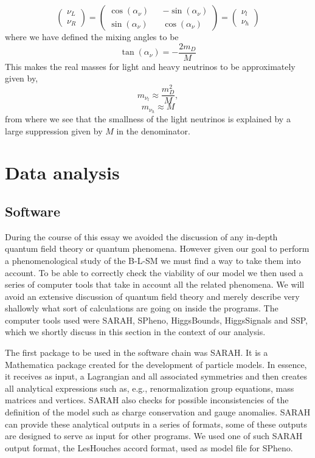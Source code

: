 \documentclass[12pt]{article}
\begin{document}
\begin{equation}
\begin{pmatrix}
\nu_L \\
\nu_R 
\end{pmatrix}= \begin{pmatrix}
\cos(\alpha_\nu) && -\sin(\alpha_\nu) \\
\sin(\alpha_\nu) && \cos(\alpha_\nu)
\end{pmatrix}= \begin{pmatrix}
\nu_l  \\
\nu_h
\end{pmatrix} 
\end{equation}
where we have defined the mixing angles to be 
\begin{equation}
\tan(\alpha_\nu)=-\frac{2m_D}{M}
\end{equation}
This makes the real masses for light and heavy neutrinos to be approximately given by,
\begin{equation}
m_{\nu_l} \approx \frac{m_D^2}{M} , 
\end{equation}
\begin{equation}
m_{\nu_h} \approx M
\end{equation}
%
%
from where we see that the smallness of the light neutrinos is explained by a large suppression given by $M$ in the denominator.

\section{Data analysis}

\subsection{Software}

During the course of this essay we avoided the discussion of any in-depth quantum field theory or quantum phenomena. However given our goal to perform a phenomenological study of the B-L-SM  we must find a way to take them into account. To be able to correctly check the viability of our model we then used a series of computer tools that take in account all the related phenomena. We will avoid an extensive discussion of quantum field theory and merely describe very shallowly what sort of calculations are going on inside the programs. The computer tools used were SARAH, SPheno, HiggsBounds, HiggsSignals and SSP, which we shortly discuss in this section in the context of our analysis.

The first package to be used in the software chain was SARAH. It is a Mathematica package created for the development of particle models. 
%
In essence, it receives as input, a Lagrangian and all associated symmetries and then creates all analytical expressions such as, e.g., renormalization group equations, mass matrices and vertices. SARAH also checks for possible inconsistencies of the definition of the model such as charge conservation and gauge anomalies.
SARAH can provide these analytical outputs in a series of formats, some of these outputs are designed to serve as input for other programs. We used one of such SARAH output format, the LesHouches accord format, used as model file for SPheno.
 
\end{document}
